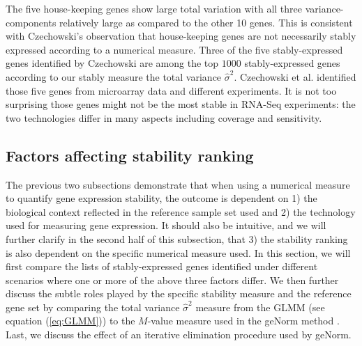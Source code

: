 \documentclass[letterpaper,12pt]{article}
\begin{document}

The five house-keeping genes show large total variation with all three
variance-components relatively large as compared to the other 10 genes. This is
consistent with Czechowski's observation that house-keeping genes are not necessarily stably
expressed according to a numerical measure. Three of the five
stably-expressed genes identified by Czechowski are among the top $1000$
stably-expressed genes according to our stably measure the total variance $\hat\sigma^2$. Czechowski et al.
identified those five genes from microarray data and different experiments. It
is not too surprising those genes might not be the most stable in RNA-Seq
experiments: the two technologies differ in many aspects including coverage
and sensitivity. 


\subsection{Factors affecting stability ranking}\label{section:stabilityMeasure}
The previous two subsections demonstrate that when using a numerical measure
to quantify gene expression stability, the outcome is dependent on 1) the
biological context reflected in the reference sample set used and 2) the
technology used for measuring gene expression. It should also be intuitive,
and we will further clarify in the second half of this subsection, that 3) the
stability ranking is also dependent on the specific numerical measure used.
In this section, we will first compare the lists of stably-expressed genes
identified under different scenarios where one or more of the above three
factors differ.  We then further discuss the subtle roles played by the
specific stability measure and the reference gene set by comparing the total
variance $\hat\sigma^2$ measure from the GLMM (see equation (\ref{eq:GLMM}))
to the $M$-value measure used in the geNorm method \citep{vandesompele2002accurate}.
Last, we discuss the effect of an iterative elimination procedure used by
geNorm.
\end{document}
